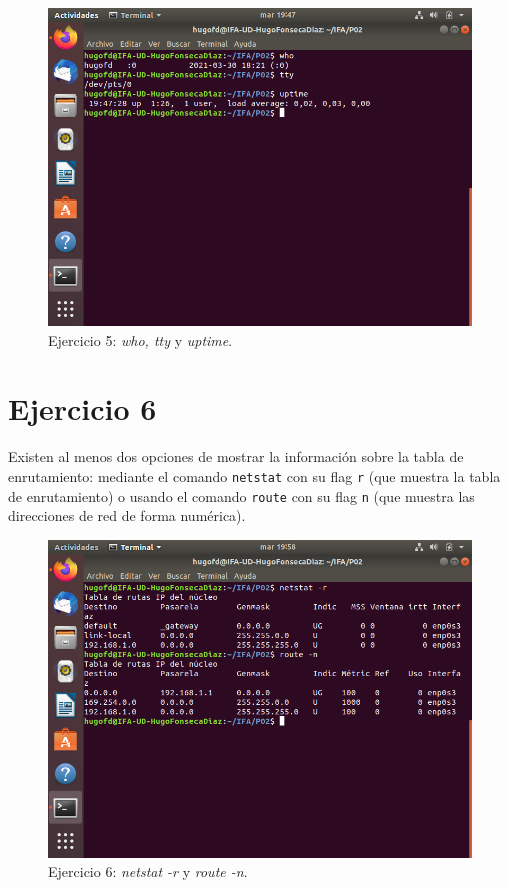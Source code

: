 \documentclass[11pt]{article}
\begin{document}
\begin{figure}[H]
    \caption{Ejercicio 5: \textit{who, tty} y \textit{uptime}.}
  \centering
  \includegraphics[scale=0.7]{e5.png}
\end{figure}

\section{Ejercicio 6}
Existen al menos dos opciones de mostrar la información sobre la tabla de enrutamiento: mediante el comando \verb|netstat| con su flag \verb|r| (que muestra la tabla de enrutamiento) o usando el comando \verb|route| con su flag \verb|n| (que muestra las direcciones de red de forma numérica).

\begin{figure}[H]
    \caption{Ejercicio 6: \textit{netstat -r} y \textit{route -n}.}
  \centering
  \includegraphics[scale=0.7]{e6.png}
\end{figure}
\end{document}
